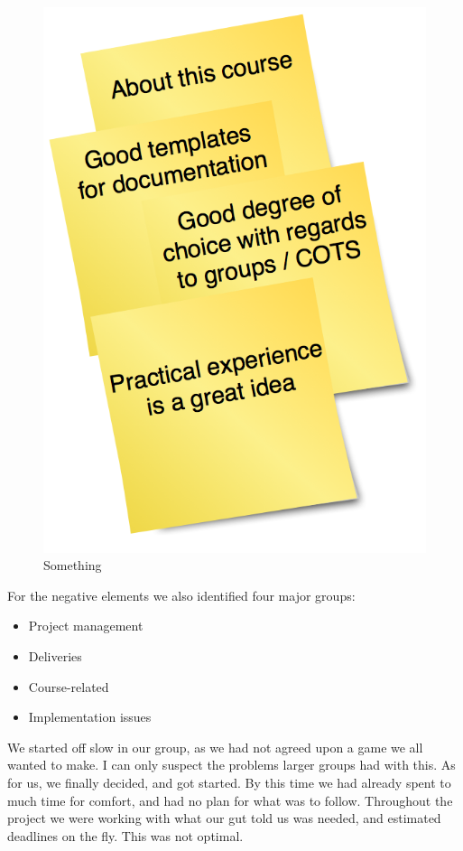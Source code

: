 \documentclass[titlepage,a4paper,11pt]{article}
\begin{document}
\begin{figure}[ht]
\begin{minipage}[b]{0.5\linewidth}
        \centering
        \includegraphics[scale=0.4]{graphics/postit/POS_about_course}
        \caption{Something}
        \label{fig:neg2}
    \end{minipage}
\end{figure}

For the negative elements we also identified four major groups:

\begin{itemize}
    \item Project management
    \item Deliveries
    \item Course-related
    \item Implementation issues
\end{itemize}

We started off slow in our group, as we had not agreed upon a game we all
wanted to make. I can only suspect the problems larger groups had with
this. As for us, we finally decided, and got started. By this time we had
already spent to much time for comfort, and had no plan for what was to
follow.  Throughout the project we were working with what our gut told us
was needed, and estimated deadlines on the fly. This was not optimal.
\end{document}
